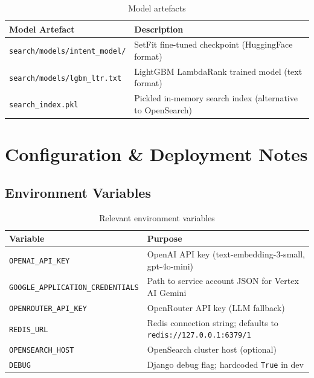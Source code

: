 \documentclass[12pt,a4paper]{article}
\begin{document}
\begin{table}[H]
\centering
\renewcommand{\arraystretch}{1.3}
\begin{tabularx}{\textwidth}{lX}
\toprule
\rowcolor{tableheader!20}
\textbf{Model Artefact} & \textbf{Description} \\
\midrule
\texttt{search/models/intent\_model/}  &
  SetFit fine-tuned checkpoint (HuggingFace format) \\
\texttt{search/models/lgbm\_ltr.txt}  &
  LightGBM LambdaRank trained model (text format) \\
\texttt{search\_index.pkl}            &
  Pickled in-memory search index (alternative to OpenSearch) \\
\bottomrule
\end{tabularx}
\caption{Model artefacts}
\end{table}

\newpage
\section{Configuration \& Deployment Notes}
\label{sec:config}

\subsection{Environment Variables}

\begin{table}[H]
\centering
\renewcommand{\arraystretch}{1.3}
\begin{tabularx}{\textwidth}{lX}
\toprule
\rowcolor{tableheader!20}
\textbf{Variable} & \textbf{Purpose} \\
\midrule
\texttt{OPENAI\_API\_KEY}           & OpenAI API key (text-embedding-3-small, gpt-4o-mini) \\
\texttt{GOOGLE\_APPLICATION\_CREDENTIALS} &
  Path to service account JSON for Vertex AI Gemini \\
\texttt{OPENROUTER\_API\_KEY}       & OpenRouter API key (LLM fallback) \\
\texttt{REDIS\_URL}                 & Redis connection string; defaults to \texttt{redis://127.0.0.1:6379/1} \\
\texttt{OPENSEARCH\_HOST}           & OpenSearch cluster host (optional) \\
\texttt{DEBUG}                      & Django debug flag; hardcoded \texttt{True} in dev \\
\bottomrule
\end{tabularx}
\caption{Relevant environment variables}
\end{table}
\end{document}
